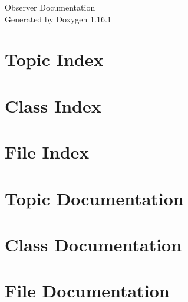 \documentclass[twoside]{book}
\newcommand{\+}{\discretionary{\mbox{\scriptsize$\hookleftarrow$}}{}{}}
\newcommand{\clearemptydoublepage}{%
    \newpage{\pagestyle{empty}\cleardoublepage}%
  }
\begin{document}
  \raggedbottom
    \hypersetup{pageanchor=false,
                bookmarksnumbered=true,
                pdfencoding=unicode
               }
  \begin{titlepage}
  \vspace*{7cm}
  \begin{center}%
  {\Large Observer Documentation}\\
  \vspace*{1cm}
  {\large Generated by Doxygen 1.16.1}\\
  \end{center}
  \end{titlepage}
  \clearemptydoublepage
  \tableofcontents
  \clearemptydoublepage
  \hypersetup{pageanchor=true}

\chapter{Topic Index}

\chapter{Class Index}

\chapter{File Index}

\chapter{Topic Documentation}



\chapter{Class Documentation}


\chapter{File Documentation}



















  \backmatter
  \newpage
  \clearemptydoublepage
  \printindex
\end{document}
